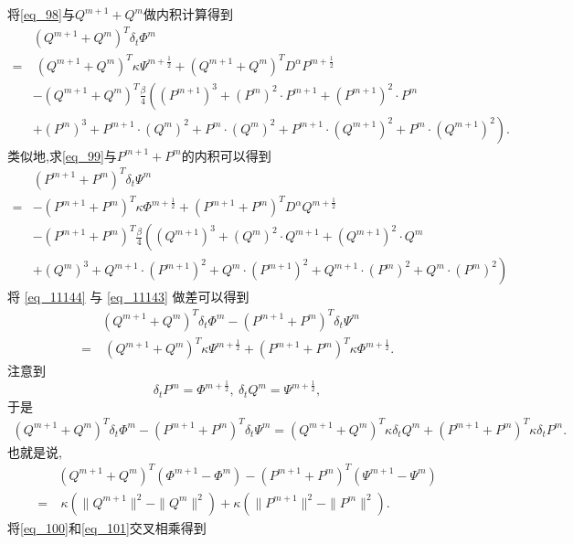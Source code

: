\begin{pf}
	将\eqref{eq_98}与$Q^{m+1}+Q^{m}$做内积计算得到
\begin{align}
&(Q^{m+1}+Q^{m})^{T}\delta_{t} \varPhi^{m}\nonumber\\
=&~(Q^{m+1}+Q^{m})^{T}\kappa \Psi^{m+\frac{1}{2}}+(Q^{m+1}+Q^{m})^{T}D^{\alpha} P^{m+\frac{1}{2}}\nonumber\\
&-(Q^{m+1}+Q^{m})^{T}\frac{\beta}{4}\left((P^{m+1})^3+(P^{m})^{2}\cdot P^{m+1}+(P^{m+1})^{2}\cdot P^{m}\right.\nonumber\\
&\left.+(P^{m})^{3}+P^{m+1}\cdot (Q^{m})^{2}+P^{m}\cdot (Q^{m})^{2}+P^{m+1}\cdot (Q^{m+1})^{2}+P^{m}\cdot (Q^{m+1})^{2}\right).\label{eq_11143}
\end{align}
类似地,求\eqref{eq_99}与$P^{m+1}+P^{m}$的内积可以得到
\begin{align}
&(P^{m+1}+P^{m})^{T}\delta_{t} \Psi^{m}\nonumber\\
=&-(P^{m+1}+P^{m})^{T}\kappa \varPhi^{m+\frac{1}{2}}+(P^{m+1}+P^{m})^{T}D^{\alpha} Q^{m+\frac{1}{2}}\nonumber\\
&-(P^{m+1}+P^{m})^{T}\frac{\beta}{4}\left((Q^{m+1})^3+(Q^{m})^{2}\cdot Q^{m+1}+(Q^{m+1})^{2}\cdot Q^{m}\right.\nonumber\\
&\left.+(Q^{m})^{3}+Q^{m+1}\cdot (P^{m+1})^{2}+Q^{m}\cdot (P^{m+1})^{2}+Q^{m+1}\cdot (P^{m})^{2}+Q^{m}\cdot (P^{m})^{2}\right)\label{eq_11144}
\end{align}
将 \eqref{eq_11144} 与 \eqref{eq_11143} 做差可以得到
\begin{align}
&(Q^{m+1}+Q^{m})^{T}\delta_{t} \varPhi^{m}-(P^{m+1}+P^{m})^{T}\delta_{t} \Psi^{m}\nonumber\\
=&~(Q^{m+1}+Q^{m})^{T}\kappa \Psi^{m+\frac{1}{2}}+(P^{m+1}+P^{m})^{T}\kappa \varPhi^{m+\frac{1}{2}}.\label{eq_11145}
\end{align}
注意到
$$\delta_t P^m=\varPhi^{m+\frac{1}{2}},~\delta_t Q^m=\Psi^{m+\frac{1}{2}},$$
于是
\begin{align}\label{eq_11146}
(Q^{m+1}+Q^{m})^{T}\delta_{t} \varPhi^{m}\!-\!(P^{m+1}+P^{m})^{T}\delta_{t} \Psi^{m}=(Q^{m+1}+Q^{m})^{T}\kappa \delta_t Q^m+(P^{m+1}+P^{m})^{T}\kappa \delta_t P^m.
\end{align}
也就是说,
\begin{align}
&(Q^{m+1}+Q^{m})^{T}(\varPhi^{m+1}-\varPhi^{m})-(P^{m+1}+P^{m})^{T}(\Psi^{m+1}-\Psi^{m})\nonumber\\
=&~\kappa (\|Q^{m+1}\|^2-\|Q^{m}\|^2)+\kappa (\|P^{m+1}\|^2-\|P^{m}\|^2).\label{eq_11147}
\end{align}
将\eqref{eq_100}和\eqref{eq_101}交叉相乘得到

\end{pf}
